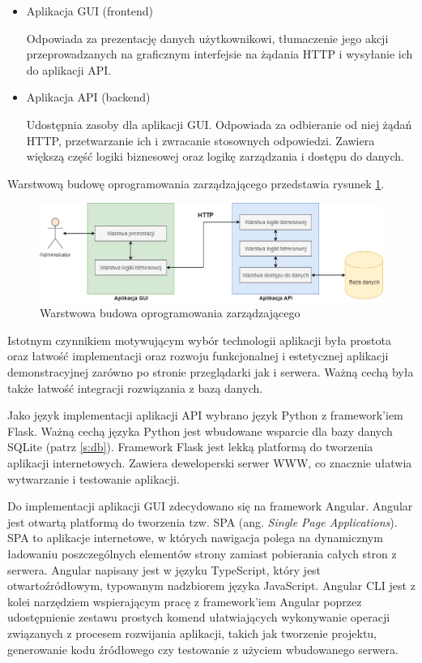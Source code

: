     	\begin{itemize}
    		\item Aplikacja GUI (frontend)

    			Odpowiada za prezentację danych użytkownikowi, tłumaczenie jego akcji przeprowadzanych na graficznym interfejsie na żądania HTTP i wysyłanie ich do aplikacji API.

    		\item Aplikacja API (backend)

    			Udostępnia zasoby dla aplikacji GUI. Odpowiada za odbieranie od niej żądań HTTP, przetwarzanie ich i zwracanie stosownych odpowiedzi. Zawiera większą część logiki biznesowej oraz logikę zarządzania i dostępu do danych.
    	\end{itemize}

    	Warstwową budowę oprogramowania zarządzającego przedstawia rysunek \ref{fig:mngmt_subs_layers}.

        \begin{figure}[]
            \centering
            \includegraphics[width=\textwidth]{chapters/images/mngmt_subsystem_layers.png}
            \caption{Warstwowa budowa oprogramowania zarządzającego}
            \label{fig:mngmt_subs_layers}
        \end{figure}

       	Istotnym czynnikiem motywującym wybór technologii aplikacji była prostota oraz łatwość implementacji oraz rozwoju funkcjonalnej i estetycznej aplikacji demonstracyjnej zarówno po stronie przeglądarki jak i serwera. Ważną cechą była także łatwość integracji rozwiązania z bazą danych.

		Jako język implementacji aplikacji API wybrano język Python z framework'iem Flask. Ważną cechą języka Python jest wbudowane wsparcie dla bazy danych SQLite (patrz \ref{s:db}). Framework Flask jest lekką platformą do tworzenia aplikacji internetowych. Zawiera deweloperski serwer WWW, co znacznie ułatwia wytwarzanie i testowanie aplikacji.

		Do implementacji aplikacji GUI zdecydowano się na framework Angular. Angular jest otwartą platformą do tworzenia tzw. SPA (ang. \textit{Single Page Applications}). SPA to aplikacje internetowe, w których nawigacja polega na dynamicznym ładowaniu poszczególnych elementów strony zamiast pobierania całych stron z serwera. Angular napisany jest w języku TypeScript, który jest otwartoźródłowym, typowanym nadzbiorem języka JavaScript. Angular CLI jest z kolei narzędziem wspierającym pracę z framework'iem Angular poprzez udostępnienie zestawu prostych komend ułatwiających wykonywanie operacji związanych z procesem rozwijania aplikacji, takich jak tworzenie projektu, generowanie kodu źródłowego czy testowanie z użyciem wbudowanego serwera.

